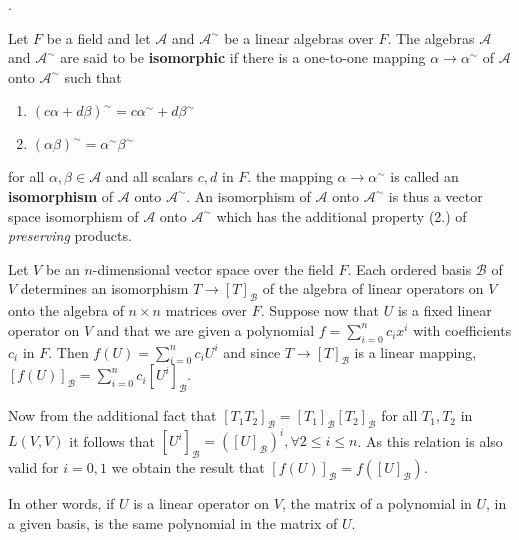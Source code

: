 \documentclass[8pt]{beamer}
\newcommand{\mc}[1]{\mathcal{#1}}
\newcommand{\tb}[1]{\textbf{#1}}
\newcommand{\ti}[1]{\textit{#1}}
\begin{document}
\begin{frame}{.}
    \begin{definition}
        Let $F$ be a field and let $\mc{A}$ and ${\mc{A}}^\sim$ be a linear algebras over $F$.
        The algebras $\mc{A}$ and $\mc{A}^\sim$ are said to be \tb{isomorphic} if there is a one-to-one mapping $\alpha \to \alpha^\sim$ of $\mc{A}$ onto $\mc{A}^\sim$ such that
        \begin{enumerate}
            \item ${(c\alpha + d \beta)}^\sim = c {\alpha}^\sim + d {\beta}^\sim$
            \item $(\alpha \beta)^\sim = \alpha^\sim \beta^\sim$
        \end{enumerate}
        for all $\alpha, \beta \in \mc{A}$ and all scalars $c, d$ in $F$. the mapping $\alpha \to \alpha^\sim$ is called an \tb{isomorphism} of $\mc{A}$ onto $\mc{A}^\sim$.
        An isomorphism of $\mc{A}$ onto $\mc{A}^\sim$ is thus a vector space isomorphism of $\mc{A}$ onto $\mc{A}^\sim$ which has the additional property (2.) of \ti{preserving} products.
    \end{definition}

    \begin{example}
        Let $V$ be an $n$-dimensional vector space over the field $F$.
        Each ordered basis $\mc{B}$ of $V$ determines an isomorphism $T \to [T]_{\mc{B}}$ of the algebra of linear operators on $V$ onto the algebra of $n \times n$ matrices over $F$.
        Suppose now that $U$ is a fixed linear operator on $V$ and that we are given a polynomial
        $f = \sum_{i=0}^n c_i x^i$ with coefficients $c_i$ in $F$.
        Then $f(U) = \sum_{i=0}^n c_i U^i$ and since $T \to [T]_{\mc{B}}$ is a linear mapping, $[f(U)]_{\mc{B}} = \sum_{i=0}^n c_i [U^i]_{\mc{B}}$.

        Now from the additional fact that $[T_1 T_2]_{\mc{B}} = [T_1]_{\mc{B}}[T_2]_{\mc{B}}$ for all $T_1, T_2$ in $L(V,V)$ it follows that $[U^i]_{\mc{B}} = ([U]_{\mc{B}})^i, \forall 2\leq i \leq n$.
        As this relation is also valid for $i=0,1$ we obtain the result that $[f(U)]_{\mc{B}} = f([U]_{\mc{B}})$.

        In other words, if $U$ is a linear operator on $V$, the matrix of a polynomial in $U$, in a given basis, is the same polynomial in the matrix of $U$.
    \end{example}
\end{frame}
\end{document}
